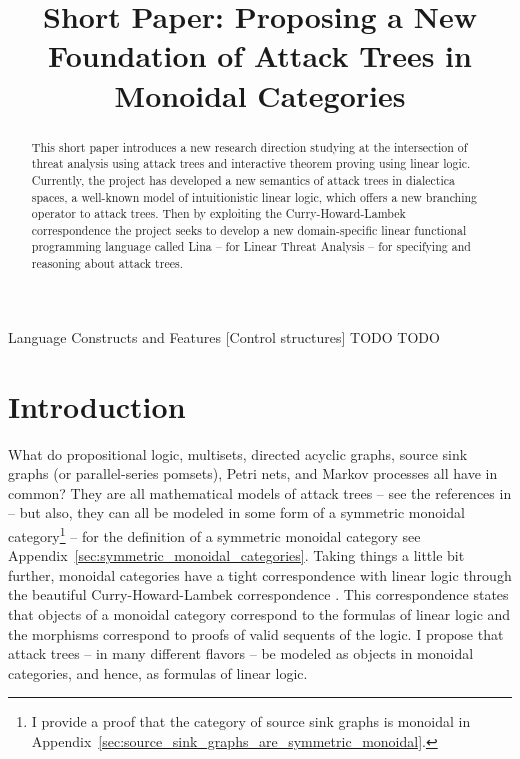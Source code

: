 \documentclass{sigplanconf}
\date{}
\begin{document}
\copyrightdata{}
\copyrightdoi{}
\titlebanner{}

\title{Short Paper: Proposing a New Foundation of Attack Trees in Monoidal Categories}


\maketitle 

\begin{abstract}
  This short paper introduces a new research direction studying at the
  intersection of threat analysis using attack trees and interactive
  theorem proving using linear logic.  Currently, the project has
  developed a new semantics of attack trees in dialectica spaces, a
  well-known model of intuitionistic linear logic, which offers a new
  branching operator to attack trees.  Then by exploiting the
  Curry-Howard-Lambek correspondence the project seeks to develop a
  new domain-specific linear functional programming language called
  Lina -- for Linear Threat Analysis -- for specifying and reasoning
  about attack trees.
\end{abstract}

{Language Constructs and Features}
[Control structures]
\terms
TODO
\keywords
TODO

\section{Introduction}
\label{sec:introduction}

What do propositional logic, multisets, directed acyclic graphs,
source sink graphs (or parallel-series pomsets), Petri nets, and
Markov processes all have in common?  They are all mathematical models
of attack trees -- see the references in
\cite{Kordy:2014a,Jhawar:2015} -- but also, they can all be modeled in
some form of a symmetric monoidal category\footnote{I provide a proof
  that the category of source sink graphs is monoidal in
  Appendix~\ref{sec:source_sink_graphs_are_symmetric_monoidal}.}
\cite{Tzouvaras:1998,Brown:1991,Fiore:2013,FrancescoAlbasini2010} --
for the definition of a symmetric monoidal category see
Appendix~\ref{sec:symmetric_monoidal_categories}.  Taking things a
little bit further, monoidal categories have a tight correspondence
with linear logic through the beautiful Curry-Howard-Lambek
correspondence \cite{MSC:4439568}.  This correspondence states that
objects of a monoidal category correspond to the formulas of linear
logic and the morphisms correspond to proofs of valid sequents of the
logic.  I propose that attack trees -- in many different flavors -- be
modeled as objects in monoidal categories, and hence, as formulas of
linear logic.
\end{document}
